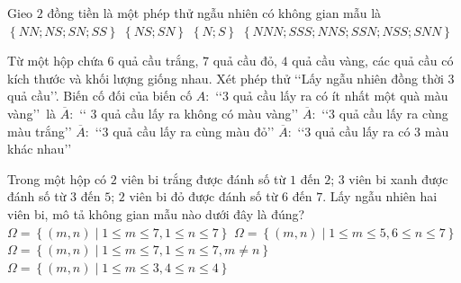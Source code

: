 \begin{ex}%
	Gieo $2$ đồng tiền là một phép thử ngẫu nhiên có không gian mẫu là 
	\choice 
		{\True $\left\lbrace NN; NS; SN; SS\right\rbrace  $}
		{$\left\lbrace  NS; SN\right\rbrace $}
		{$\left\lbrace  N; S\right\rbrace $}
		{$\left\lbrace NNN; SSS; NNS; SSN; NSS; SNN\right\rbrace  $}
\end{ex}

\begin{ex}%
	Từ một hộp chứa $6$ quả cầu trắng, $7$ quả cầu đỏ, $4$ quả  cầu vàng, các quả cầu có kích thước và khối lượng giống nhau. Xét phép thử \lq \lq Lấy ngẫu nhiên đồng thời $3$ quả cầu\rq \rq. Biến cố đối của biến cố $A \colon$ \lq \lq $3$ quả cầu lấy ra có ít nhất một quà màu vàng\rq \rq \ là
	\choice 
		{\True $\overline{A} \colon$ \lq  \lq
		$3$ quả cầu lấy ra không có màu vàng\rq \rq} 
		{$\overline{A}\colon$ \lq \lq $3$ quả cầu lấy ra cùng màu trắng\rq  \rq}
		 {$\overline{A}\colon$ \lq \lq $3$ quả cầu lấy ra cùng màu đỏ\rq \rq}
		{$\overline{A}\colon$ \lq \lq $3$  quả cầu lấy ra có $3$ màu khác nhau\rq \rq}
\end{ex}

\begin{ex}%
	 Trong một hộp có
	$2$ viên bi trắng được đánh số từ $1$ đến  $2$;
	$3$ viên bi xanh được đánh  số từ $3$ đến $5$;
	$2$  viên bi đỏ được đánh số từ $6$ đến $7$.
	Lấy ngẫu nhiên hai viên bi, mô tả  không gian mẫu nào dưới đây là đúng?
	 \choice
		{$\Omega =  \left\{\left(m, n\right)\mid 1 \le m \le 7, 1 \le n \le 7\right\}$}
		{$\Omega = \left\{\left(m, n\right)\mid 1 \le m \le 5, 6  \le n \le 7\right\}$}
		{\True $\Omega = \left\{\left(m, n\right)\mid 1 \le m \le 7, 1  \le n \le 7, m \ne n\right\}$}
		{$\Omega = \left\{\left(m, n\right)\mid 1  \le m \le 3, 4 \le n \le 4\right\}$}
\end{ex}

